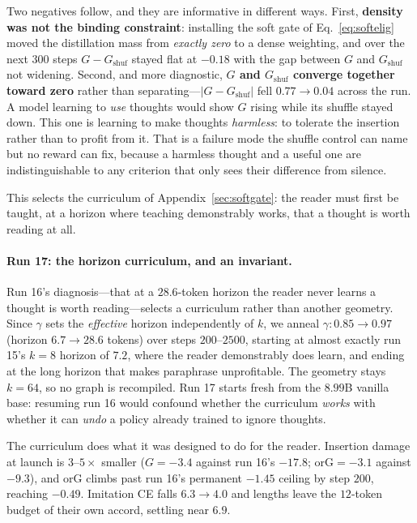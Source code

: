 \documentclass{article} %
\newcommand{\gain}{G}
\begin{document}
Two negatives follow, and they are informative in different ways. First, \textbf{density was not the binding constraint}: installing the soft gate of Eq.~\eqref{eq:softelig} moved the distillation mass from \emph{exactly zero} to a dense weighting, and over the next $300$ steps $\gain - \gain_{\mathrm{shuf}}$ stayed flat at $-0.18$ with the gap between $\gain$ and $\gain_{\mathrm{shuf}}$ not widening. Second, and more diagnostic, \textbf{$\gain$ and $\gain_{\mathrm{shuf}}$ converge together toward zero} rather than separating---$|{\gain - \gain_{\mathrm{shuf}}}|$ fell $0.77 \to 0.04$ across the run. A model learning to \emph{use} thoughts would show $\gain$ rising while its shuffle stayed down. This one is learning to make thoughts \emph{harmless}: to tolerate the insertion rather than to profit from it. That is a failure mode the shuffle control can name but no reward can fix, because a harmless thought and a useful one are indistinguishable to any criterion that only sees their difference from silence.

This selects the curriculum of Appendix~\ref{sec:softgate}: the reader must first be taught, at a horizon where teaching demonstrably works, that a thought is worth reading at all.

\paragraph{Run 17: the horizon curriculum, and an invariant.}
\label{sec:run17}
Run 16's diagnosis---that at a $28.6$-token horizon the reader never learns a thought is worth reading---selects a curriculum rather than another geometry. Since $\gamma$ sets the \emph{effective} horizon independently of $k$, we anneal $\gamma: 0.85 \to 0.97$ (horizon $6.7 \to 28.6$ tokens) over steps $200$--$2500$, starting at almost exactly run 15's $k{=}8$ horizon of $7.2$, where the reader demonstrably does learn, and ending at the long horizon that makes paraphrase unprofitable. The geometry stays $k{=}64$, so no graph is recompiled. Run 17 starts fresh from the $8.99$B vanilla base: resuming run 16 would confound whether the curriculum \emph{works} with whether it can \emph{undo} a policy already trained to ignore thoughts.

The curriculum does what it was designed to do for the reader. Insertion damage at launch is $3$--$5\times$ smaller ($\gain = -3.4$ against run 16's $-17.8$; $\mathrm{orG} = -3.1$ against $-9.3$), and $\mathrm{orG}$ climbs past run 16's permanent $-1.45$ ceiling by step $200$, reaching $-0.49$. Imitation CE falls $6.3 \to 4.0$ and lengths leave the $12$-token budget of their own accord, settling near $6.9$.
\end{document}
